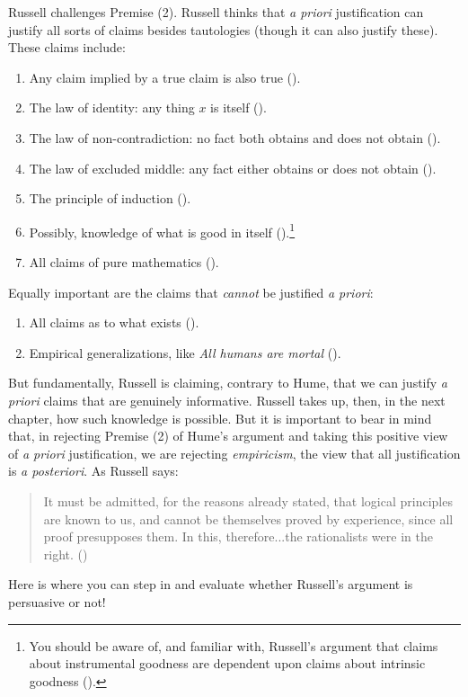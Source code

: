 \documentclass[oneside,letterpaper,12pt]{book}
\begin{document}
Russell challenges Premise (2). Russell thinks that \textit{a priori} justification can justify all sorts of claims besides tautologies (though it can also justify these). These claims include:
\begin{enumerate}
	\item Any claim implied by a true claim is also true (\pageref{mp}).
	\item The law of identity: any thing $x$ is itself (\pageref{identity}).
	\item The law of non-contradiction: no fact both obtains and does not obtain (\pageref{lnc}).
	\item The law of excluded middle: any fact either obtains or does not obtain (\pageref{lem}).
	\item The principle of induction (\pageref{induction}).
	\item Possibly, knowledge of what is good in itself (\pageref{thegood}).\footnote{You should be aware of, and familiar with, Russell's argument that claims about instrumental goodness are dependent upon claims about intrinsic goodness (\pageref{thegood}).}
	\item All claims of pure mathematics (\pageref{puremath}).
\end{enumerate}
Equally important are the claims that \textit{cannot} be justified \textit{a priori}:
\begin{enumerate}
	\item All claims as to what exists (\pageref{exist}).
	\item Empirical generalizations, like \textit{All humans are mortal} (\pageref{empirical}).
\end{enumerate}
But fundamentally, Russell is claiming, contrary to Hume, that we can justify \textit{a priori} claims that are genuinely informative. Russell takes up, then, in the next chapter, how such knowledge is possible. But it is important to bear in mind that, in rejecting Premise (2) of Hume's argument and taking this positive view of \textit{a priori} justification, we are rejecting \textit{empiricism}, the view that all justification is \textit{a posteriori}. As Russell says:
\begin{quote}
	It must be admitted, for the reasons already stated, that logical principles are known to us, and cannot be themselves proved by experience, since all proof presupposes them. In this, therefore...the rationalists were in the right. (\pageref{rationalists})
\end{quote}
Here is where you can step in and evaluate whether Russell's argument is persuasive or not!
\end{document}
